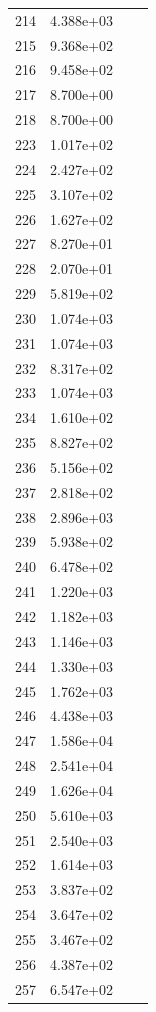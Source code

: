\documentclass[12pt]{article}
\begin{document}
\begin{longtable}{@{}cccc@{}}
214 & 4.388e+03 &  &  \\
215 & 9.368e+02 &  &  \\
216 & 9.458e+02 &  &  \\
217 & 8.700e+00 &  &  \\
218 & 8.700e+00 &  &  \\
223 & 1.017e+02 &  &  \\
224 & 2.427e+02 &  &  \\
225 & 3.107e+02 &  &  \\
226 & 1.627e+02 &  &  \\
227 & 8.270e+01 &  &  \\
228 & 2.070e+01 &  &  \\
229 & 5.819e+02 &  &  \\
230 & 1.074e+03 &  &  \\
231 & 1.074e+03 &  &  \\
232 & 8.317e+02 &  &  \\
233 & 1.074e+03 &  &  \\
234 & 1.610e+02 &  &  \\
235 & 8.827e+02 &  &  \\
236 & 5.156e+02 &  &  \\
237 & 2.818e+02 &  &  \\
238 & 2.896e+03 &  &  \\
239 & 5.938e+02 &  &  \\
240 & 6.478e+02 &  &  \\
241 & 1.220e+03 &  &  \\
242 & 1.182e+03 &  &  \\
243 & 1.146e+03 &  &  \\
244 & 1.330e+03 &  &  \\
245 & 1.762e+03 &  &  \\
246 & 4.438e+03 &  &  \\
247 & 1.586e+04 &  &  \\
248 & 2.541e+04 &  &  \\
249 & 1.626e+04 &  &  \\
250 & 5.610e+03 &  &  \\
251 & 2.540e+03 &  &  \\
252 & 1.614e+03 &  &  \\
253 & 3.837e+02 &  &  \\
254 & 3.647e+02 &  &  \\
255 & 3.467e+02 &  &  \\
256 & 4.387e+02 &  &  \\
257 & 6.547e+02 &  &  \\

\end{longtable}
\end{document}
